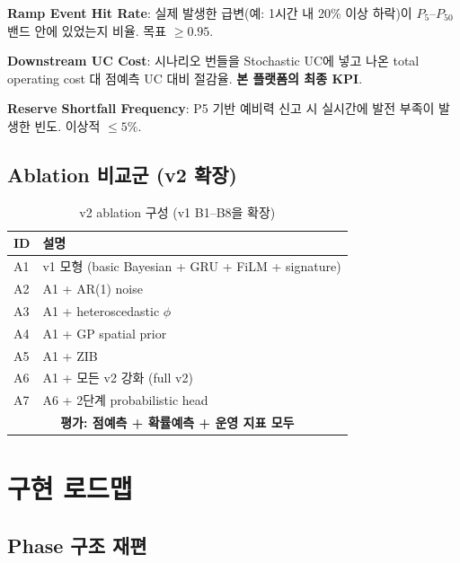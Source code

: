 \documentclass[11pt,a4paper]{article}
\begin{document}
\textbf{Ramp Event Hit Rate}: 실제 발생한 급변(예: 1시간 내 20\% 이상 하락)이 $P_5$--$P_{50}$ 밴드 안에 있었는지 비율. 목표 $\ge 0.95$.

\textbf{Downstream UC Cost}: 시나리오 번들을 Stochastic UC에 넣고 나온 total operating cost 대 점예측 UC 대비 절감율. \textbf{본 플랫폼의 최종 KPI}.

\textbf{Reserve Shortfall Frequency}: P5 기반 예비력 신고 시 실시간에 발전 부족이 발생한 빈도. 이상적 $\le 5\%$.

\subsection{Ablation 비교군 (v2 확장)}

\begin{table}[H]
\centering
\small
\caption{v2 ablation 구성 (v1 B1--B8을 확장)}
\begin{tabular}{ll}
\toprule
ID & 설명 \\
\midrule
A1 & v1 모형 (basic Bayesian + GRU + FiLM + signature) \\
A2 & A1 + AR(1) noise \\
A3 & A1 + heteroscedastic $\phi$ \\
A4 & A1 + GP spatial prior \\
A5 & A1 + ZIB \\
A6 & A1 + 모든 v2 강화 (full v2) \\
A7 & A6 + 2단계 probabilistic head \\
\midrule
\multicolumn{2}{c}{\textbf{평가: 점예측 + 확률예측 + 운영 지표 모두}} \\
\bottomrule
\end{tabular}
\end{table}

\section{구현 로드맵}

\subsection{Phase 구조 재편}
\end{document}
